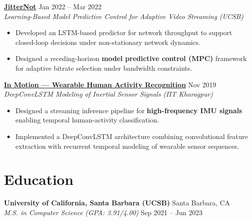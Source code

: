 \documentclass[10pt,letterpaper]{article}
\begin{document}
\noindent
\textbf{
\href{https://satyam-aw.github.io/projects/jitternot/}
{JitterNot}}
\hfill Jan 2022 -- Mar 2022
\\
\textit{Learning-Based Model Predictive Control for Adaptive Video Streaming
(UCSB)}

\begin{itemize}

    \item Developed an LSTM-based predictor for network throughput
    to support closed-loop decisions under non-stationary network dynamics.

    \item Designed a receding-horizon
    \textbf{model predictive control (MPC)}
    framework for adaptive bitrate selection under bandwidth constraints.

\end{itemize}


\noindent
\textbf{
\href{https://satyam-aw.github.io/projects/in_motion_har_deepconvlstm/}
{In Motion --- Wearable Human Activity Recognition}}
\hfill Nov 2019
\\
\textit{DeepConvLSTM Modeling of Inertial Sensor Signals (IIT Kharagpur)}

\begin{itemize}

    \item Designed a streaming inference pipeline for
    \textbf{high-frequency IMU signals}
    enabling temporal human-activity classification.

    \item Implemented a DeepConvLSTM architecture combining
    convolutional feature extraction with recurrent temporal modeling
    of wearable sensor sequences.

\end{itemize}


\section*{Education}

\noindent
\textbf{University of California, Santa Barbara (UCSB)}
\hfill Santa Barbara, CA
\\
\textit{M.S. in Computer Science (GPA: 3.91/4.00)}
\hfill Sep 2021 -- Jun 2023
\end{document}
